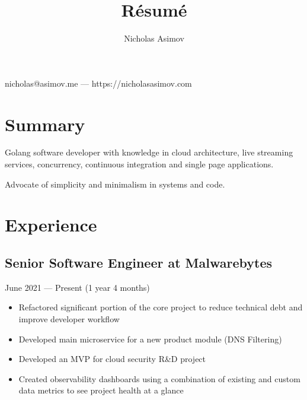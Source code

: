 \documentclass[a4paper,11pt]{article}
\makeatletter
\renewcommand{\maketitle}{
    \begin{center}
        {
            \huge
            \bfseries
            \theauthor
        }
 
        \vspace{.25em}
        nicholas@asimov.me --- https://nicholasasimov.com
    \end{center}
}
\makeatother
\begin{document}
\title{R\'esum\'e}
\author{Nicholas Asimov}

\maketitle

\section{Summary}

Golang software developer with knowledge in cloud architecture, live streaming services, concurrency,
continuous integration and single page applications.
\newline

\noindent
Advocate of simplicity and minimalism in systems and code.

\section{Experience}

\subsection{Senior Software Engineer at Malwarebytes}
June 2021 --- Present (1 year 4 months)
\begin{itemize}[noitemsep]
    \renewcommand{\labelitemi}{---}

    \item Refactored significant portion of the core project to reduce technical debt and improve developer workflow
    \item Developed main microservice for a new product module (DNS Filtering)
    \item Developed an MVP for cloud security R\&D project
    \item Created observability dashboards using a combination of existing and custom data metrics to see project health at a glance
\end{itemize}
\end{document}
